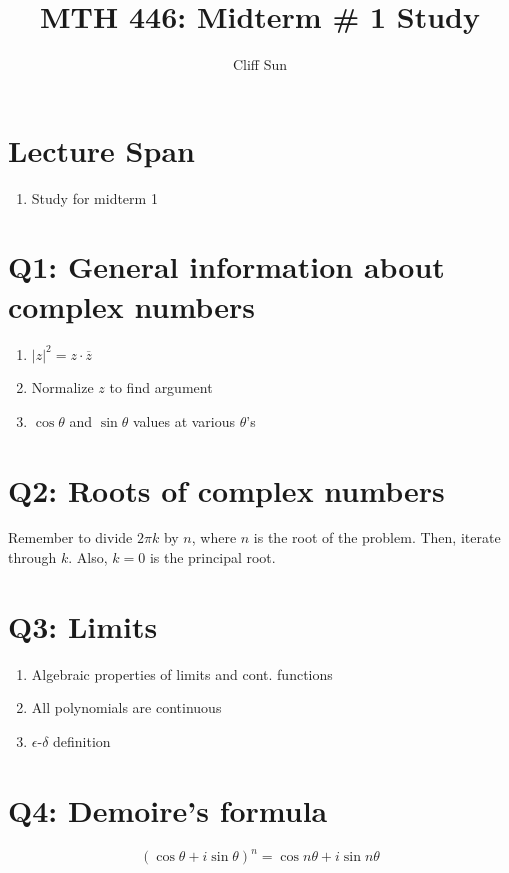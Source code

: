 \documentclass{article}
\title{MTH 446: Midterm \# 1 Study}
\author{Cliff Sun}
\newtheorem{one minute paper}[theorem]{One Minute Paper}
\begin{document}
\maketitle

\section*{Lecture Span}
\begin{enumerate}
    \item Study for midterm 1
\end{enumerate}

\section*{Q1: General information about complex numbers}

\begin{enumerate}
    \item $|z|^2 = z\cdot\overline{z}$
    \item Normalize $z$ to find argument
    \item $\cos\theta$ and $\sin\theta$ values at various $\theta$'s 
\end{enumerate}

\section*{Q2: Roots of complex numbers}

Remember to divide $2\pi k$ by $n$, where $n$ is the root of the problem. Then, iterate through $k$. Also, $k=0$ is the principal root. 

\section*{Q3: Limits}

\begin{enumerate}
    \item Algebraic properties of limits and cont. functions
    \item All polynomials are continuous
    \item $\epsilon$-$\delta$ definition
\end{enumerate}

\section*{Q4: Demoire's formula}

\begin{equation}
    (\cos\theta + i\sin\theta)^n = \cos n\theta + i \sin n\theta
\end{equation}
\end{document}
